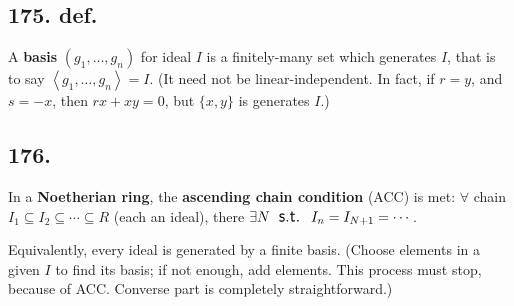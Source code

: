 \documentclass[12pt]{article}
\newcommand\Ev\forall%
\newcommand\Ex\exists%
\newcommand\St{\textsf{\large \: s.t. \:}}%
\newcommand{\Ab}[1]{ \left\langle #1 \right\rangle } %
\newcommand{\Ss}[1]{\textsf{\bfseries{#1}}}%
\begin{document}
\subsection*{175. def.} A \Ss{basis} \((g_1,\dotsc,g_n)\) for ideal \(I\) is a finitely-many set which generates \(I\), that is to say \(\Ab{g_1,\dotsc,g_n} =I\). 
(It need not be linear-independent. 
In fact, if \(r=y\), and \(s=-x\), then \(rx+xy=0\), but \(\{x,y\}\) is generates \(I\).)

\subsection*{176.} In a \Ss{Noetherian ring}, the \Ss{ascending chain condition} (ACC) is met: \(\Ev\) chain \(I_1 \subseteq I_2 \subseteq\dotsb\subseteq R\) (each an ideal), there \(\Ex N \St I_n =I_{N+1} =\dotsb\). \par
Equivalently, every ideal is generated by a finite basis. 
(Choose elements in a given \(I\) to find its basis; if not enough, add elements. This process must stop, because of ACC. 
Converse part is completely straightforward.)
\end{document}
